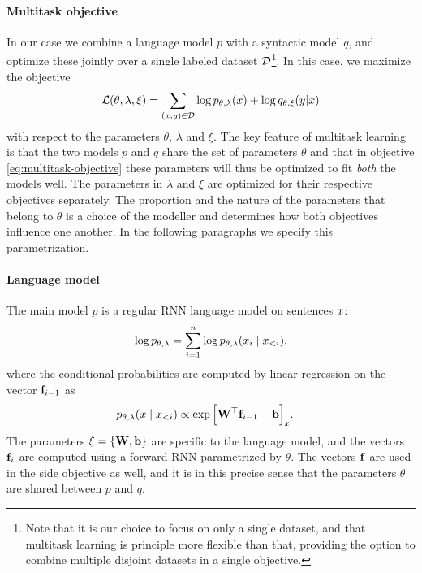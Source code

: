 \paragraph{Multitask objective}
In our case we combine a language model $p$ with a syntactic model $q$, and optimize these jointly over a single labeled dataset $\mathcal{D}$\footnote{Note that it is our choice to focus on only a single dataset, and that multitask learning is principle more flexible than that, providing the option to combine multiple disjoint datasets in a single objective.}. In this case, we maximize the objective
\begin{equation}
  \label{eq:multitask-objective}
  \mathcal{L}(\theta, \lambda, \xi) = \sum_{ (x, y) \in \mathcal{D} }\log p_{\theta, \lambda}(x) + \log q_{\theta,\xi}(y | x)
\end{equation}
with respect to the parameters $\theta$, $\lambda$ and $\xi$. The key feature of multitask learning is that the two models $p$ and $q$ share the set of parameters $\theta$ and that in objective \ref{eq:multitask-objective} these parameters will thus be optimized to fit \textit{both} the models well. The parameters in $\lambda$ and $\xi$ are optimized for their respective objectives separately. The proportion and the nature of the parameters that belong to $\theta$ is a choice of the modeller and determines how both objectives influence one another. In the following paragraphs we specify this parametrization.

\paragraph{Language model}
The main model $p$ is a regular RNN language model on sentences $x$:
\begin{align*}
  \log p_{\theta, \lambda} = \sum_{i=1}^n \log p_{\theta, \lambda}(x_i \mid x_{<i}),
\end{align*}
where the conditional probabilities are computed by linear regression on the vector $\mathbf{f}_{i-1}$ as
\begin{align*}
  p_{\theta, \lambda}( x \mid x_{<i}) &\propto \exp \Big[ \mathbf{W}^{\top} \mathbf{f}_{i-1} + \mathbf{b} \Big]_{x}.
\end{align*}
The parameters $\xi = \{ \mathbf{W}, \mathbf{b} \}$ are specific to the language model, and the vectors $\mathbf{f}_i$ are computed using a forward RNN parametrized by $\theta$. The vectors $\mathbf{f}$ are used in the side objective as well, and it is in this precise sense that the parameters $\theta$ are shared between $p$ and $q$.

